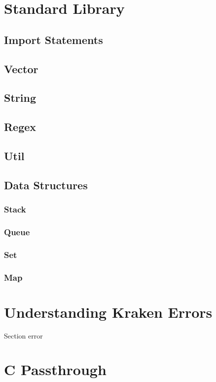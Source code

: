 \documentclass{article}
\begin{document}
\section{Standard Library}
  \subsection{Import Statements}
  \subsection{Vector}
  \subsection{String}
  \subsection{Regex}
  \subsection{Util}
  \subsection{Data Structures}
    \subsubsection{Stack}
    \subsubsection{Queue}
    \subsubsection{Set}
    \subsubsection{Map}
\section{Understanding Kraken Errors}
  Section error
\section{C Passthrough}
\end{document}
